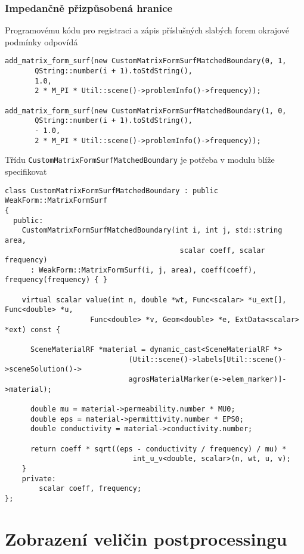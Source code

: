 \subsubsection*{Impedančně přizpůsobená hranice}
Programovému kódu pro registraci a zápis příslušných slabých forem okrajové podmínky odpovídá
\begin{verbatim}
add_matrix_form_surf(new CustomMatrixFormSurfMatchedBoundary(0, 1,
       QString::number(i + 1).toStdString(),
       1.0,
       2 * M_PI * Util::scene()->problemInfo()->frequency));
       
add_matrix_form_surf(new CustomMatrixFormSurfMatchedBoundary(1, 0,
       QString::number(i + 1).toStdString(),
       - 1.0,
       2 * M_PI * Util::scene()->problemInfo()->frequency));            
\end{verbatim}
Třídu \texttt{CustomMatrixFormSurfMatchedBoundary} je potřeba v modulu blíže specifikovat
\begin{verbatim}
class CustomMatrixFormSurfMatchedBoundary : public WeakForm::MatrixFormSurf
{
  public:
    CustomMatrixFormSurfMatchedBoundary(int i, int j, std::string area, 
                                         scalar coeff, scalar frequency)
      : WeakForm::MatrixFormSurf(i, j, area), coeff(coeff), frequency(frequency) { }

    virtual scalar value(int n, double *wt, Func<scalar> *u_ext[], Func<double> *u, 
                    Func<double> *v, Geom<double> *e, ExtData<scalar> *ext) const {
      
      SceneMaterialRF *material = dynamic_cast<SceneMaterialRF *>
                             (Util::scene()->labels[Util::scene()->sceneSolution()->
                             agrosMaterialMarker(e->elem_marker)]->material);

      double mu = material->permeability.number * MU0;
      double eps = material->permittivity.number * EPS0;
      double conductivity = material->conductivity.number;

      return coeff * sqrt((eps - conductivity / frequency) / mu) * 
                              int_u_v<double, scalar>(n, wt, u, v);
    }
    private:
        scalar coeff, frequency;
};
\end{verbatim}

\section{Zobrazení veličin postprocessingu}
